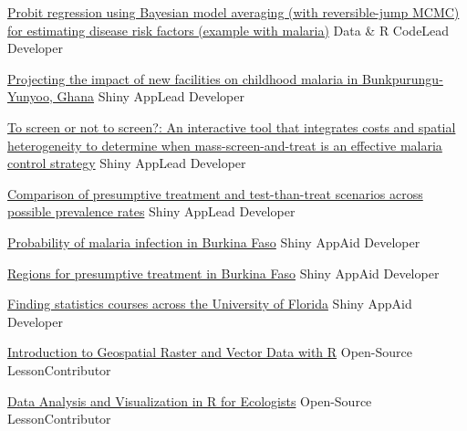 
\begin{cventries}

\cventry
    {} %
    {\href{https://github.com/justinmillar/bma-malaria}{Probit regression using Bayesian model averaging (with reversible-jump MCMC) for estimating disease risk factors (example with malaria)}} %
    {Data \& R Code{\enskip\cdotp\enskip}Lead Developer} %
    {} %
    {
    }

\cventry
    {} %
    {\href{https://jjmillar.shinyapps.io/byd-health-facilities/}{Projecting the impact of new facilities on childhood malaria in Bunkpurungu-Yunyoo, Ghana}} %
    {Shiny App{\enskip\cdotp\enskip}Lead Developer} %
    {} %
    {
    }

\cventry
    {} %
    {\href{https://jjmillar.shinyapps.io/msat-example/}{To screen or not to screen?: An interactive tool that integrates costs and spatial heterogeneity to determine when mass-screen-and-treat is an effective malaria control strategy}} %
    {Shiny App{\enskip\cdotp\enskip}Lead Developer} %
    {} %
    {
    }

\cventry
    {} %
    {\href{https://jjmillar.shinyapps.io/msat-general/}{Comparison of presumptive treatment and test-than-treat scenarios across possible prevalence rates}} %
    {Shiny App{\enskip\cdotp\enskip}Lead Developer} %
    {} %
    {
    }
    
\cventry
    {} %
    {\href{https://denisvalle.shinyapps.io/burkina_faso_tool/}{Probability of malaria infection in Burkina Faso}} %
    {Shiny App{\enskip\cdotp\enskip}Aid Developer} %
    {} %
    {
    }
    
\cventry
    {} %
    {\href{https://denisvalle.shinyapps.io/burkina_faso_map/}{Regions for presumptive treatment in Burkina Faso}} %
    {Shiny App{\enskip\cdotp\enskip}Aid Developer} %
    {} %
    {
    }
    
\cventry
    {} %
    {\href{https://ufstatscourses.shinyapps.io/shiny_tutorial/}{Finding statistics courses across the University of Florida}} %
    {Shiny App{\enskip\cdotp\enskip}Aid Developer} %
    {} %
    {
    }

\cventry
    {} %
    {\href{https://datacarpentry.org/r-raster-vector-geospatial}{Introduction to Geospatial Raster and Vector Data with R}} %
    {Open-Source Lesson{\enskip\cdotp\enskip}Contributor} %
    {} %
    {
    }

\cventry
    {} %
    {\href{https://datacarpentry.org/R-ecology-lesson/}{Data Analysis and Visualization in R for Ecologists}} %
    {Open-Source Lesson{\enskip\cdotp\enskip}Contributor} %
    {} %
    {
    }

\end{cventries}